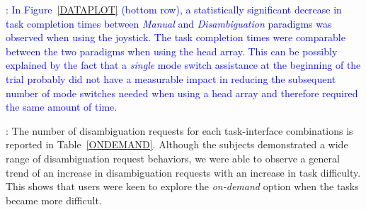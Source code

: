 \documentclass[conference]{IEEEtran}
\begin{document}
\vspace{0.1cm}
: 
\textcolor{blue}{In Figure~\ref{DATAPLOT} (bottom row), a statistically significant decrease in task completion times between \textit{Manual} and \textit{Disambiguation} paradigms was observed when using the joystick. The task completion times were comparable between the two paradigms when using the head array. This can be possibly explained by the fact that a \textit{single} mode switch assistance at the beginning of the trial probably did not have a measurable impact in reducing the subsequent number of mode switches needed when using a head array and therefore required the same amount of time}. 

\vspace{0.1cm}
: The number of disambiguation requests for each task-interface combinations is reported in Table~\ref{ONDEMAND}. Although the subjects demonstrated a wide range of disambiguation request behaviors, we were able to observe a general trend of an increase in disambiguation requests with an increase in task difficulty. This shows that users were keen to explore the \textit{on-demand} option when the tasks became more difficult. 
\end{document}
